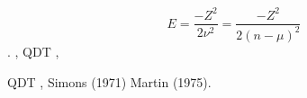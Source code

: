 \documentclass[a4paper]{article}
\begin{document}
\begin{equation*}
E=\frac{-Z^2}{2\nu ^2}=\frac{-Z^2}{2(n-\mu )^2}
\end{equation*}
{\CYRV} {\cyrr}{\cyra}{\cyrb}{\cyro}{\cyrt}{\cyra}{\cyrh} {\CYRB}{\cyre}{\cyrishrt}{\cyrt}{\cyrs}{\cyra} {\cyri}
{\CYRD}{\cyra}{\cyrm}{\cyrg}{\cyra}{\cyra}{\cyrr}{\cyrd} {\cyrb}{\cyrery}{\cyrl}
{\cyrp}{\cyrr}{\cyre}{\cyrd}{\cyrl}{\cyro}{\cyrzh}{\cyre}{\cyrn} {\cyrm}{\cyre}{\cyrt}{\cyro}{\cyrd}
{\cyrr}{\cyra}{\cyrs}{\cyrch}{\cyre}{\cyrt}{\cyra} {\cyrs}{\cyri}{\cyrl}
{\cyro}{\cyrs}{\cyrc}{\cyri}{\cyrl}{\cyrl}{\cyrya}{\cyrt}{\cyro}{\cyrr}{\cyro}{\cyrv}
{\cyrs}{\cyrv}{\cyrya}{\cyrz}{\cyra}{\cyrn}{\cyrn}{\cyrery}{\cyrh}
{\cyrs}{\cyro}{\cyrs}{\cyrt}{\cyro}{\cyrya}{\cyrn}{\cyri}{\cyrishrt} {\cyrd}{\cyrl}{\cyrya}
{\cyrp}{\cyrr}{\cyro}{\cyrs}{\cyrt}{\cyrery}{\cyrh} {\cyra}{\cyrt}{\cyro}{\cyrm}{\cyrn}{\cyrery}{\cyrh}
{\cyrs}{\cyri}{\cyrs}{\cyrt}{\cyre}{\cyrm}. {\CYRT}{\cyra}{\cyrk}{\cyri}{\cyrm}
{\cyro}{\cyrb}{\cyrr}{\cyra}{\cyrz}{\cyro}{\cyrm}, {\cyrm}{\cyre}{\cyrt}{\cyro}{\cyrd} QDT {\cyrd}{\cyra}{\cyre}{\cyrt}
{\cyrt}{\cyra}{\cyrk}{\cyrzh}{\cyre} {\cyrv}{\cyro}{\cyrz}{\cyrm}{\cyro}{\cyrzh}{\cyrn}{\cyro}{\cyrs}{\cyrt}{\cyrsftsn}
{\cyrp}{\cyrr}{\cyro}{\cyrs}{\cyrt}{\cyro}{\cyrg}{\cyro} {\cyrr}{\cyra}{\cyrs}{\cyrch}{\cyre}{\cyrt}{\cyra}
{\cyrs}{\cyri}{\cyrl} {\cyro}{\cyrs}{\cyrc}{\cyri}{\cyrl}{\cyrl}{\cyrya}{\cyrt}{\cyro}{\cyrr}{\cyro}{\cyrv}
{\cyrd}{\cyrl}{\cyrya} {\cyrerev}{\cyrl}{\cyre}{\cyrk}{\cyrt}{\cyrr}{\cyro}{\cyrn}{\cyrn}{\cyrery}{\cyrh}
{\cyrp}{\cyre}{\cyrr}{\cyre}{\cyrh}{\cyro}{\cyrd}{\cyro}{\cyrv}, {\cyrch}{\cyrt}{\cyro} {\cyri}
{\cyrb}{\cyrery}{\cyrl}{\cyro} {\cyri}{\cyrs}{\cyrp}{\cyro}{\cyrl}{\cyrsftsn}{\cyrz}{\cyro}{\cyrv}{\cyra}{\cyrn}{\cyro}
{\cyrv} {\cyrn}{\cyra}{\cyrs}{\cyrt}{\cyro}{\cyrya}{\cyrshch}{\cyre}{\cyrishrt}
{\cyrr}{\cyra}{\cyrb}{\cyro}{\cyrt}{\cyre}

{\CYRA}{\cyrl}{\cyrsftsn}{\cyrt}{\cyre}{\cyrr}{\cyrn}{\cyra}{\cyrt}{\cyri}{\cyrv}{\cyrn}{\cyrery}{\cyrishrt} QDT
{\cyrm}{\cyre}{\cyrt}{\cyro}{\cyrd} {\cyrv}{\cyrery}{\cyrch}{\cyri}{\cyrs}{\cyrl}{\cyre}{\cyrn}{\cyri}{\cyrya}
{\cyrs}{\cyri}{\cyrl} {\cyro}{\cyrs}{\cyrc}{\cyri}{\cyrl}{\cyrl}{\cyrya}{\cyrt}{\cyro}{\cyrr}{\cyro}{\cyrv}
{\cyrs}{\cyrv}{\cyrya}{\cyrz}{\cyra}{\cyrn} {\cyrs}
{\cyri}{\cyrs}{\cyrp}{\cyro}{\cyrl}{\cyrsftsn}{\cyrz}{\cyro}{\cyrv}{\cyra}{\cyrn}{\cyri}{\cyre}{\cyrm}
{\cyrm}{\cyro}{\cyrd}{\cyre}{\cyrl}{\cyrsftsn}{\cyrn}{\cyro}{\cyrg}{\cyro}
{\cyrp}{\cyro}{\cyrt}{\cyre}{\cyrn}{\cyrc}{\cyri}{\cyra}{\cyrl}{\cyra},
{\cyrv}{\cyrp}{\cyre}{\cyrr}{\cyrv}{\cyrery}{\cyre}
{\cyrp}{\cyrr}{\cyre}{\cyrd}{\cyrl}{\cyro}{\cyrzh}{\cyre}{\cyrn}{\cyrn}{\cyro}{\cyrg}{\cyro} {\cyrv}
{\cyrr}{\cyra}{\cyrb}{\cyro}{\cyrt}{\cyra}{\cyrh} Simons (1971) {\cyri} Martin (1975). 
\end{document}
